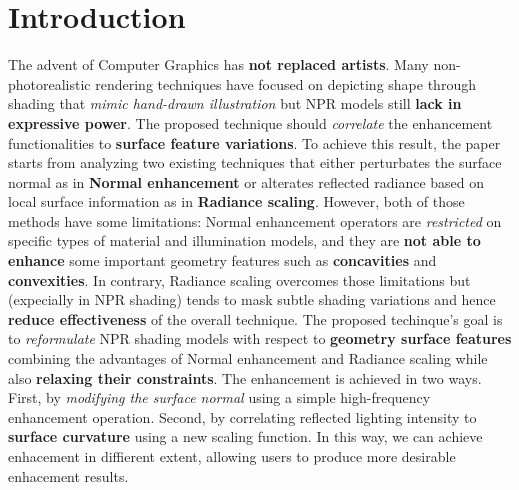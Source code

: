 \section{Introduction}
The advent of Computer Graphics has \textbf{not replaced artists}. Many non-photorealistic rendering techniques have focused on depicting shape through shading that \textit{mimic hand-drawn illustration} but NPR models still \textbf{lack in expressive power}. \newline
The proposed technique should \textit{correlate} the enhancement functionalities to \textbf{surface feature variations}. To achieve this result, the paper \cite{referencePaper} starts from analyzing two existing techniques that either perturbates the surface normal as in \textbf{Normal enhancement} or alterates reflected radiance based on local surface information as in \textbf{Radiance scaling}. \newline
However, both of those methods have some limitations: \newline 
Normal enhancement operators are \textit{restricted} on specific types of material and illumination models, and they are \textbf{not able to enhance} some important geometry features such as \textbf{concavities} and \textbf{convexities}. In contrary, Radiance scaling overcomes those limitations but (expecially in NPR shading) tends to mask subtle shading variations and hence \textbf{reduce effectiveness} of the overall technique. \newline
The proposed techinque's goal is to \textit{reformulate} NPR shading models with respect to \textbf{geometry surface features} combining the advantages of Normal enhancement and Radiance scaling while also \textbf{relaxing their constraints}. \newline
The enhancement is achieved in two ways. First, by \textit{modifying the surface normal} using a simple high-frequency enhancement operation. Second, by correlating reflected lighting intensity to \textbf{surface curvature} using a new scaling function. \newline
In this way, we can achieve enhacement in diffierent extent, allowing users to produce more desirable enhacement results.

